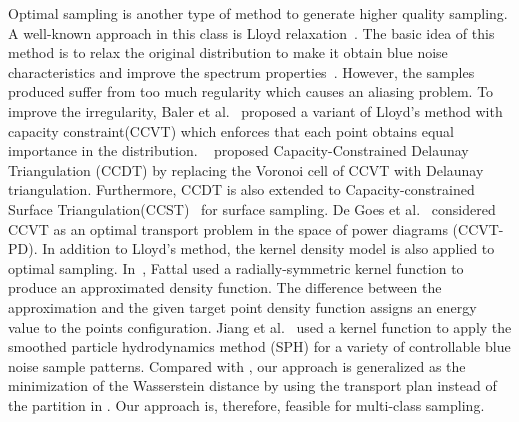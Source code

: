 Optimal sampling is another type of method to generate higher quality sampling.
A well-known approach in this class is Lloyd relaxation~\cite{lloyd:1982:least}.
The basic idea of this method
is to relax the original distribution to make it obtain blue noise
characteristics and improve the spectrum properties~\cite{mccool:1992:hierarchical}.
However, the  samples produced suffer from too much regularity which causes an aliasing problem.
To improve the irregularity,
Baler et al.~ proposed a variant of Lloyd's method with capacity constraint(CCVT)
which enforces that each point obtains equal importance in the distribution.
~\cite{xu:2011:capacity} proposed Capacity-Constrained Delaunay Triangulation (CCDT) by replacing the Voronoi cell of CCVT with Delaunay triangulation.
Furthermore, CCDT is also extended to Capacity-constrained Surface Triangulation(CCST)~\cite{xu:2012:blue} for surface sampling.
De Goes et al.~ considered CCVT as an optimal transport problem in
the space of power diagrams (CCVT-PD).
In addition to Lloyd's method,
the kernel density model is also applied to optimal sampling.
In~\cite{fattal:2011:blue},
Fattal used a radially-symmetric kernel function to produce an approximated density function.
The difference between the approximation and the given target point density function assigns an energy value to the points configuration.
Jiang et al.~ used a kernel function to apply the smoothed particle hydrodynamics method  (SPH) for a variety of controllable blue noise sample patterns.
Compared with \cite{de:2012:blue},
our approach is generalized as the minimization of the Wasserstein distance
by using the transport plan instead of the partition in \cite{de:2012:blue}.
Our approach is, therefore, feasible for multi-class sampling.


